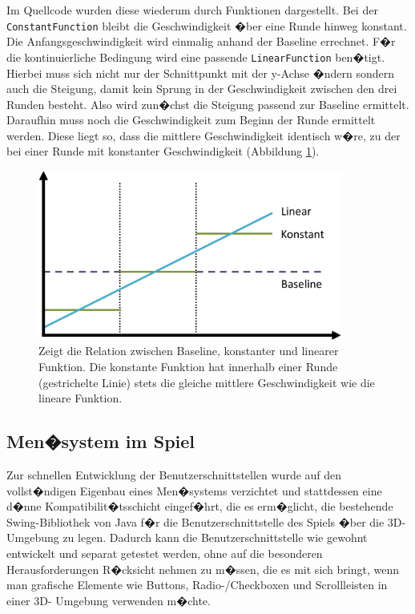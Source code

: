 \documentclass[a4paper,12pt]{scrartcl}
\newcommand*{\code}[1]{\texttt{#1}}%
\begin{document}
Im Quellcode wurden diese wiederum durch Funktionen dargestellt. Bei der
\code{ConstantFunction} bleibt die Geschwindigkeit �ber eine Runde hinweg konstant.
Die Anfangsgeschwindigkeit wird einmalig anhand der Baseline errechnet. F�r die
kontinuierliche Bedingung wird eine passende \code{LinearFunction} ben�tigt. Hierbei muss
sich nicht nur der Schnittpunkt mit der y-Achse �ndern sondern auch die Steigung,
damit kein Sprung in der Geschwindigkeit zwischen den drei Runden besteht. Also
wird zun�chst die Steigung passend zur Baseline ermittelt. Daraufhin muss noch
die Geschwindigkeit zum Beginn der Runde ermittelt werden. Diese liegt so, dass
die mittlere Geschwindigkeit identisch w�re, zu der bei einer Runde mit konstanter
Geschwindigkeit (Abbildung \ref{fig:SessionTypen}).

\begin{figure}[htp]
\begin{center}
  \includegraphics[width=10cm]{SessionTypen.pdf}
  \caption[Vergleich der Geschwindigkeitsfunktionen]{Zeigt die Relation zwischen
  Baseline, konstanter und linearer Funktion. Die konstante Funktion hat innerhalb einer Runde (gestrichelte Linie) stets die gleiche
mittlere Geschwindigkeit wie die lineare Funktion.}
  \label{fig:SessionTypen}
\end{center}
\end{figure}

\subsection{Men�system im Spiel}
Zur schnellen Entwicklung der Benutzerschnittstellen wurde auf den
vollst�ndigen Eigenbau eines Men�systems verzichtet und stattdessen eine d�nne Kompatibilit�tsschicht
eingef�hrt, die es erm�glicht, die bestehende Swing-Bibliothek von Java f�r die
Benutzerschnittstelle des Spiels �ber die 3D-Umgebung zu legen. Dadurch kann die
Benutzerschnittstelle wie gewohnt entwickelt und separat getestet werden, ohne auf die
besonderen Herausforderungen R�cksicht nehmen zu m�ssen, die es mit sich bringt, wenn
man grafische Elemente wie Buttons, Radio-/Checkboxen und Scrollleisten in einer 3D-
Umgebung verwenden m�chte.
\end{document}
